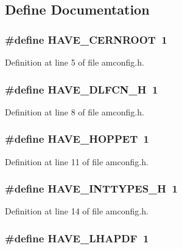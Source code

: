 \subsection{Define Documentation}
\subsubsection[{HAVE\_\-CERNROOT}]{\setlength{\rightskip}{0pt plus 5cm}\#define HAVE\_\-CERNROOT~1}\label{amconfig_8h_aae9555c2bf69cf94ccdb884e8ae5aa88}


Definition at line 5 of file amconfig.h.
\subsubsection[{HAVE\_\-DLFCN\_\-H}]{\setlength{\rightskip}{0pt plus 5cm}\#define HAVE\_\-DLFCN\_\-H~1}\label{amconfig_8h_a0ee1617ff2f6885ef384a3dd46f9b9d7}


Definition at line 8 of file amconfig.h.
\subsubsection[{HAVE\_\-HOPPET}]{\setlength{\rightskip}{0pt plus 5cm}\#define HAVE\_\-HOPPET~1}\label{amconfig_8h_aa03b9522e1222e39e6fec641e8e96f0c}


Definition at line 11 of file amconfig.h.
\subsubsection[{HAVE\_\-INTTYPES\_\-H}]{\setlength{\rightskip}{0pt plus 5cm}\#define HAVE\_\-INTTYPES\_\-H~1}\label{amconfig_8h_ab90a030ff2790ebdc176660a6dd2a478}


Definition at line 14 of file amconfig.h.
\subsubsection[{HAVE\_\-LHAPDF}]{\setlength{\rightskip}{0pt plus 5cm}\#define HAVE\_\-LHAPDF~1}\label{amconfig_8h_affb6049135c9dcba9598585bb3e20d0e}


